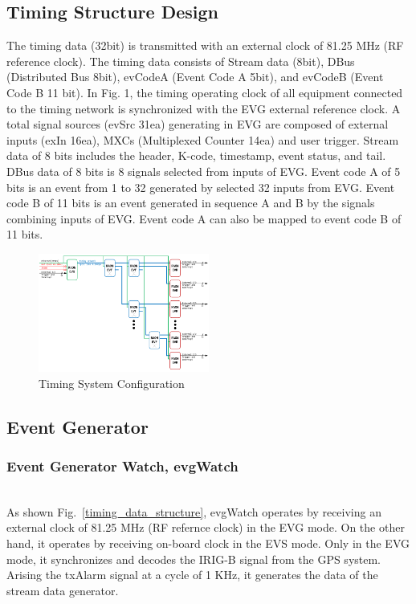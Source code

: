 \documentclass[journal,reqno]{IEEEtran}
\begin{document}
\subsection{Timing Structure Design}
The timing data (32bit) is transmitted with an external clock of 81.25 MHz (RF reference clock). The timing data consists of Stream data (8bit), DBus (Distributed Bus 8bit), evCodeA (Event Code A 5bit), and evCodeB (Event Code B 11 bit). In Fig. 1, the timing operating clock of all equipment connected to the timing network is synchronized with the EVG external reference clock. A total signal sources (evSrc 31ea) generating in EVG are composed of external inputs (exIn 16ea), MXCs (Multiplexed Counter 14ea) and user trigger. Stream data of 8 bits includes the header, K-code, timestamp, event status, and tail. DBus data of 8 bits is 8 signals selected from inputs of EVG. Event code A of 5 bits is an event from 1 to 32 generated by selected 32 inputs from EVG. Event code B of 11 bits is an event generated in sequence A and B by the signals combining inputs of EVG. Event code A can also be mapped to event code B of 11 bits.

\begin{figure}[!htb]
	\centering
	\includegraphics*[width=0.5\textwidth, height=0.4\textwidth]{img02.png}
	\caption{Timing System Configuration}
	\label{timing_system_configuration}
\end{figure}


\subsection{Event Generator}
\subsubsection{Event Generator Watch, evgWatch}\hspace*{\fill} \\
As shown Fig.~\ref{timing_data_structure}, evgWatch operates by receiving an external clock of 81.25 MHz (RF refernce clock) in the EVG mode. On the other hand, it operates by receiving on-board clock in the EVS mode. Only in the EVG mode, it synchronizes and decodes the IRIG-B signal from the GPS system. Arising the txAlarm signal at a cycle of 1 KHz, it generates the data of the stream data generator.\newline
\end{document}

